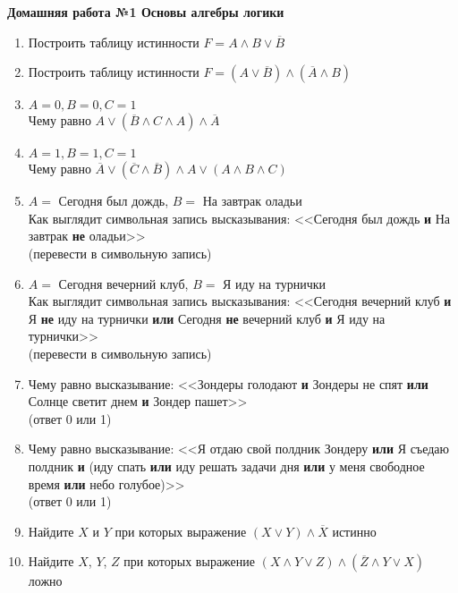 



    \begin{center}
        \textbf{Домашняя работа №1 Основы алгебры логики}
    \end{center}

    \begin{enumerate}
        \item Построить таблицу истинности $F = A \wedge B \vee \overline B$

        \item Построить таблицу истинности $F = (A \vee \overline B) \wedge (\overline A \wedge B)$

        \item $A = 0, B = 0, C = 1$\\
        Чему равно $A \vee (\overline B \wedge C \wedge A) \wedge \overline A$

        \item $A = 1, B = 1, C = 1$\\
        Чему равно $\overline A \vee (\overline C \wedge \overline B) \wedge A \vee (A \wedge B \wedge C)$

        \item $A = $ Сегодня был дождь, $B = $ На завтрак оладьи\\
        Как выглядит символьная запись высказывания: <<Сегодня был дождь \textbf{и} На завтрак \textbf{не} оладьи>>\\
        (перевести в символьную запись)

        \item $A = $ Сегодня вечерний клуб, $B = $ Я иду на турнички\\
        Как выглядит символьная запись высказывания: <<Сегодня вечерний клуб \textbf{и} Я \textbf{не} иду на турнички \textbf{или} Сегодня \textbf{не} вечерний клуб \textbf{и} Я иду на турнички>>\\
        (перевести в символьную запись)

        \item Чему равно высказывание: <<Зондеры голодают \textbf{и} Зондеры не спят \textbf{или} Солнце светит днем \textbf{и} {Зондер пашет}>>\\
        (ответ 0 или 1)

        \item Чему равно высказывание: <<Я отдаю свой полдник Зондеру \textbf{или} Я съедаю полдник \textbf{и} (иду спать \textbf{или} иду решать задачи дня \textbf{или} у меня свободное время \textbf{или} небо голубое)>>\\
        (ответ 0 или 1)

        \item Найдите $X$ и $Y$ при которых выражение $(X \vee Y) \wedge \overline X$ истинно

        \item Найдите $X$, $Y$, $Z$ при которых выражение $(X \wedge Y \vee Z) \wedge(\overline Z \wedge Y \vee X)$ ложно
    \end{enumerate}


